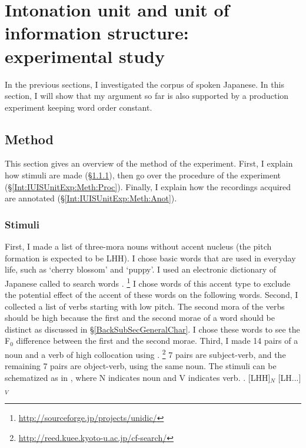 \section[IU and IS unit: experimental study]{Intonation unit and unit of information structure: experimental study}\label{Int:IUISUnitExp}

In the previous sections,
I investigated the corpus of spoken Japanese.
In this section,
I will show that my argument so far is also supported by a production experiment keeping word order constant.


\subsection{Method}\label{Int:IUISUnitExp:Meth}

This section gives an overview of the method of the experiment.
First, I explain how stimuli are made (\S \ref{Int:IUISUnitExp:Meth:Sti}),
then go over the procedure of the experiment (\S \ref{Int:IUISUnitExp:Meth:Proc}).
Finally,
I explain how the recordings acquired are annotated (\S \ref{Int:IUISUnitExp:Meth:Anot}).

\subsubsection{Stimuli}\label{Int:IUISUnitExp:Meth:Sti}

First, I made a list of three-mora nouns without accent nucleus (the pitch formation is expected to be LHH).
I chose basic words that are used in everyday life,
such as  `cherry blossom' and  `puppy'.
I used an electronic dictionary of Japanese called 
to search words
\cite{denetal02,denetal07}.%
	\footnote{\url{http://sourceforge.jp/projects/unidic/}}
I chose words of this accent type to
exclude the potential effect of the accent of these words on the following words.
Second, I collected a list of verbs starting with low pitch.
The second mora of the verbs should be high because the first and the second morae of a word should be distinct as discussed in \S \ref{BackSubSecGeneralChar}.
I chose these words to see the F$_{0}$ difference between the first
and the second morae.
Third, I made 14 pairs of a noun and a verb of high collocation using  \cite{kawaharakurohashi06b,kawaharakurohashi06}.%
	\footnote{\url{http://reed.kuee.kyoto-u.ac.jp/cf-search/}}
7 pairs are subject-verb, and
the remaining 7 pairs are object-verb,
using the same noun.
The stimuli can be schematized as in \Next,
where N indicates noun and V indicates verb.
%
\ex. [LHH]$_{N}$ [LH...]$_{V}$


